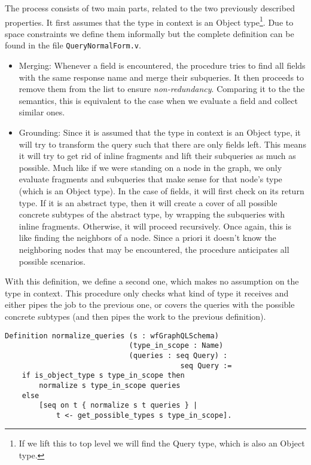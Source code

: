 The process consists of two main parts, related to the two previously described properties. It first assumes that the type in context is an Object type\footnote{If we lift this to top level we will find the Query type, which is also an Object type.}. Due to space constraints we define them informally but the complete definition can be found in the file \texttt{QueryNormalForm.v}.

\begin{itemize}
    \item Merging: Whenever a field is encountered, the procedure tries to find all fields with the same response name and merge their subqueries. It then proceeds to remove them from the list to ensure \textit{non-redundancy}. Comparing it to the the semantics, this is equivalent to the case when we evaluate a field and collect similar ones.

    \item Grounding: Since it is assumed that the type in context is an Object type, it will try to transform the query such that there are only fields left. This means it will try to get rid of inline fragments and lift their subqueries as much as possible. Much like if we were standing on a node in the graph, we only evaluate fragments and subqueries that make sense for that node's type (which is an Object type). In the case of fields, it will first check on its return type. If it is an abstract type, then it will create a cover of all possible concrete subtypes of the abstract type, by wrapping the subqueries with inline fragments. Otherwise, it will proceed recursively. Once again, this is like finding the neighbors of a node. Since a priori it doesn't know the neighboring nodes that may be encountered, the procedure anticipates all possible scenarios.
\end{itemize}

With this definition, we define a second one, which makes no assumption on the type in context. This procedure only checks what kind of type it receives and either pipes the job to the previous one, or covers the queries with the possible concrete subtypes (and then pipes the work to the previous definition).

\begin{verbatim}
Definition normalize_queries (s : wfGraphQLSchema)
                             (type_in_scope : Name)
                             (queries : seq Query) :
                                         seq Query :=
    if is_object_type s type_in_scope then
        normalize s type_in_scope queries
    else
        [seq on t { normalize s t queries } |
            t <- get_possible_types s type_in_scope].

\end{verbatim}

